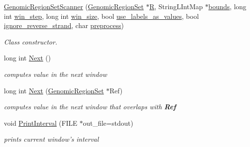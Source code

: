\begin{DoxyCompactItemize}
\item 
\hyperlink{classGenomicRegionSetScanner_a308979aaa369991fcbb3f3f9877c807d}{GenomicRegionSetScanner} (\hyperlink{classGenomicRegionSet}{GenomicRegionSet} $\ast$\hyperlink{classGenomicRegionSetScanner_af76bf4fef482886f23f58cfa12c3eea1}{R}, StringLIntMap $\ast$\hyperlink{classGenomicRegionSetScanner_a7f64551c26331cd4ead1ab01405f1b72}{bounds}, long int \hyperlink{classGenomicRegionSetScanner_ab278dfa27c3589865b9243156c1c727f}{win\_\-step}, long int \hyperlink{classGenomicRegionSetScanner_aeed625b2a12aa2f7900997c4e20cd9b5}{win\_\-size}, bool \hyperlink{classGenomicRegionSetScanner_ad47603d08614ab993fe9036662c421e7}{use\_\-labels\_\-as\_\-values}, bool \hyperlink{classGenomicRegionSetScanner_a10c1d22ae74e6f295cd17259f70eff8a}{ignore\_\-reverse\_\-strand}, char \hyperlink{classGenomicRegionSetScanner_af2a536e23023f96c57f51e2276b4be0e}{preprocess})
\begin{DoxyCompactList}\small\item\em Class constructor. \end{DoxyCompactList}\item 
\hypertarget{classGenomicRegionSetScanner_ad0e45066dc2f22d3c211d1e7d885bd87}{
long int \hyperlink{classGenomicRegionSetScanner_ad0e45066dc2f22d3c211d1e7d885bd87}{Next} ()}
\label{classGenomicRegionSetScanner_ad0e45066dc2f22d3c211d1e7d885bd87}

\begin{DoxyCompactList}\small\item\em computes value in the next window \end{DoxyCompactList}\item 
\hypertarget{classGenomicRegionSetScanner_a4b8c62b87b640dedb5d37647c5dfb844}{
long int \hyperlink{classGenomicRegionSetScanner_a4b8c62b87b640dedb5d37647c5dfb844}{Next} (\hyperlink{classGenomicRegionSet}{GenomicRegionSet} $\ast$Ref)}
\label{classGenomicRegionSetScanner_a4b8c62b87b640dedb5d37647c5dfb844}

\begin{DoxyCompactList}\small\item\em computes value in the next window that overlaps with {\bfseries Ref} \end{DoxyCompactList}\item 
\hypertarget{classGenomicRegionSetScanner_a142b27e90970f87a2902e62aa143af8e}{
void \hyperlink{classGenomicRegionSetScanner_a142b27e90970f87a2902e62aa143af8e}{PrintInterval} (FILE $\ast$out\_\-file=stdout)}
\label{classGenomicRegionSetScanner_a142b27e90970f87a2902e62aa143af8e}

\begin{DoxyCompactList}\small\item\em prints current window's interval \end{DoxyCompactList}\end{DoxyCompactItemize}

